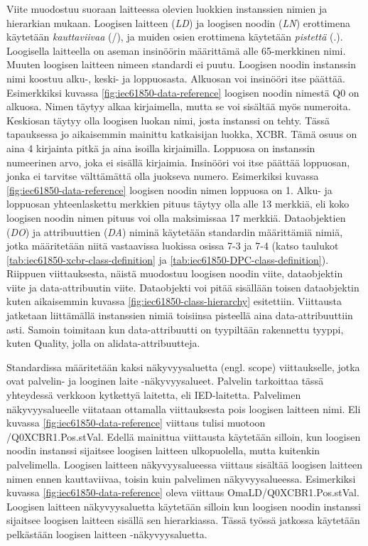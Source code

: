 Viite muodostuu suoraan laitteessa olevien luokkien instanssien nimien ja hierarkian mukaan. Loogisen laitteen (\emph{LD}) ja loogisen noodin (\emph{LN}) erottimena käytetään \emph{kauttaviivaa} (/), ja muiden osien erottimena käytetään \emph{pistettä} (.). Loogisella laitteella on aseman insinöörin määrittämä alle 65-merkkinen nimi. Muuten loogisen laitteen nimeen standardi ei puutu. Loogisen noodin instanssin nimi koostuu alku-, keski- ja loppuosasta. Alkuosan voi insinööri itse päättää. Esimerkkiksi kuvassa \ref{fig:iec61850-data-reference} loogisen noodin nimestä Q0 on alkuosa. Nimen täytyy alkaa kirjaimella, mutta se voi sisältää myös numeroita. Keskiosan täytyy olla loogisen luokan nimi, josta instanssi on tehty. Tässä tapauksessa jo aikaisemmin mainittu katkaisijan luokka, XCBR. Tämä osuus on aina 4 kirjainta pitkä ja aina isoilla kirjaimilla. Loppuosa on instanssin numeerinen arvo, joka ei sisällä kirjaimia. Insinööri voi itse päättää loppuosan, jonka ei tarvitse välttämättä olla juokseva numero. Esimerkiksi kuvassa \ref{fig:iec61850-data-reference} loogisen noodin nimen loppuosa on 1. 
Alku- ja loppuosan yhteenlaskettu merkkien pituus täytyy olla alle 13 merkkiä, eli koko loogisen noodin nimen pituus voi olla maksimissaa 17 merkkiä. Dataobjektien (\emph{DO}) ja attribuuttien (\emph{DA}) niminä käytetään standardin määrittämiä nimiä, jotka määritetään niitä vastaavissa luokissa osissa 7-3 ja 7-4 (katso taulukot \ref{tab:iec61850-xcbr-class-definition} ja \ref{tab:iec61850-DPC-class-definition}). Riippuen viittauksesta, näistä muodostuu loogisen noodin viite, dataobjektin viite ja data-attribuutin viite. Dataobjekti voi pitää sisällään toisen dataobjektin kuten aikaisemmin kuvassa \ref{fig:iec61850-class-hierarchy} esitettiin. Viittausta jatketaan liittämällä instanssien nimiä toisiinsa pisteellä aina data-attribuuttiin asti. Samoin toimitaan kun data-attribuutti on tyypiltään rakennettu tyyppi, kuten Quality, jolla on alidata-attribuutteja. \mbox{\cite[s.~181--182]{IEC61850-7-2}} \mbox{\cite[s.~93--95]{IEC61850-7-1}}

Standardissa määritetään kaksi näkyvyysaluetta (engl. scope) viittaukselle, jotka ovat palvelin- ja looginen laite -näkyvyysalueet. Palvelin tarkoittaa tässä yhteydessä verkkoon kytkettyä laitetta, eli IED-laitetta. Palvelimen näkyvyysalueelle viitataan ottamalla viittauksesta pois loogisen laitteen nimi. Eli kuvassa \ref{fig:iec61850-data-reference} viittaus tulisi muotoon /Q0XCBR1.\-Pos.\-stVal. Edellä mainittua viittausta käytetään silloin, kun loogisen noodin instanssi sijaitsee loogisen laitteen ulkopuolella, mutta kuitenkin palvelimella. Loogisen laitteen näkyvyysalueessa viittaus sisältää loogisen laitteen nimen ennen kauttaviivaa, toisin kuin palvelimen näkyvyysalueessa. Esimerkiksi kuvassa \ref{fig:iec61850-data-reference} oleva viittaus OmaLD/\-Q0XCBR1.\-Pos.\-stVal. Loogisen laitteen näkyvyysaluetta käytetään silloin kun loogisen noodin instanssi sijaitsee loogisen laitteen sisällä sen hierarkiassa. Tässä työssä jatkossa käytetään pelkästään loogisen laitteen -näkyvyysaluetta. \mbox{\cite[s.~183]{IEC61850-7-2}}

